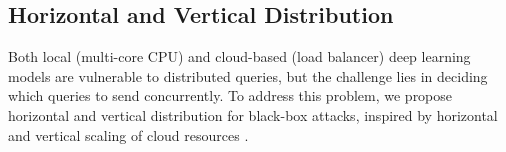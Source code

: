 







\subsection{Horizontal and Vertical Distribution}
\label{horizon_vertical}

Both local (multi-core CPU) and cloud-based (load balancer) deep learning models are vulnerable to distributed queries, but the challenge lies in deciding which queries to send concurrently. To address this problem, we propose horizontal and vertical distribution for black-box attacks, inspired by horizontal and vertical scaling of cloud resources \citep{Millnert2020}.


